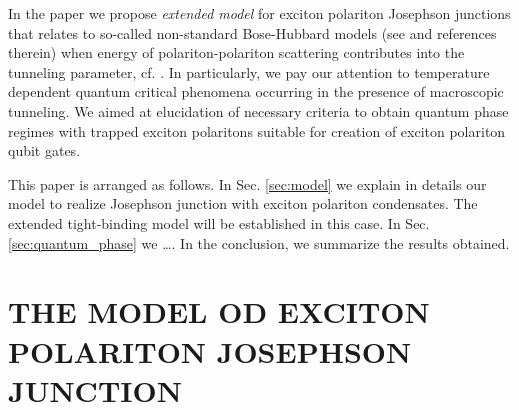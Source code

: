 \documentclass[aps, pre, preprint, groupedaddress, superscriptaddress, showkeys, showpacs] {revtex4-1}
\begin{document}
In the paper we propose \textit{extended model} for exciton polariton Josephson junctions that relates to so-called non-standard Bose-Hubbard models (see \cite{Dutta} and references therein) when energy of polariton-polariton scattering contributes into the tunneling parameter, cf. \cite{Aleiner, Shelykh_2008, Borgh_2010, Solnyshkov_2008, Sarchi}.
In particularly, we pay our attention to temperature dependent quantum critical phenomena occurring in the presence of macroscopic tunneling.
We aimed at elucidation of necessary criteria to obtain quantum phase regimes with trapped exciton polaritons suitable for creation of exciton polariton qubit gates.

This paper is arranged as follows.
In Sec. \ref{sec:model} we explain in details our model to realize Josephson junction with exciton polariton condensates.
The extended tight-binding model will be established in this case.
In Sec. \ref{sec:quantum_phase} we \dots.
In the conclusion, we summarize the results obtained.

\section{THE MODEL OD EXCITON POLARITON JOSEPHSON JUNCTION \label{sec:model}}
\end{document}

